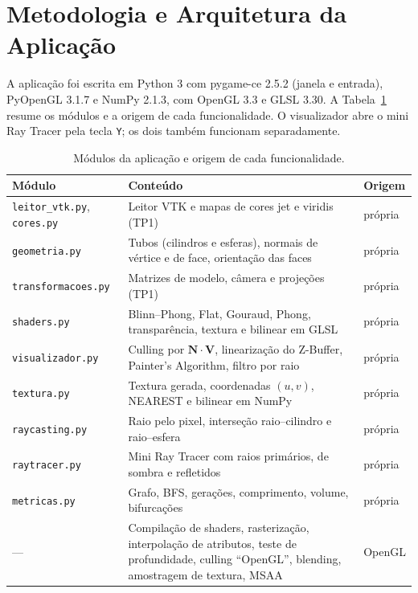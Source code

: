 \documentclass[11pt, a4paper]{article}
\newcommand{\vetor}[1]{\mathbf{#1}}
\begin{document}
\section{Metodologia e Arquitetura da Aplicação}

A aplicação foi escrita em Python 3 com pygame-ce 2.5.2 (janela e entrada), PyOpenGL 3.1.7 e NumPy 2.1.3, com OpenGL 3.3 e GLSL 3.30. A Tabela~\ref{tab:modulos} resume os módulos e a origem de cada funcionalidade. O visualizador abre o mini Ray Tracer pela tecla \texttt{Y}; os dois também funcionam separadamente.

\begin{table}[H]
  \centering
  \small
  \caption{Módulos da aplicação e origem de cada funcionalidade.}
  \label{tab:modulos}
  \begin{tabularx}{\textwidth}{l X l}
    \toprule
    \textbf{Módulo} & \textbf{Conteúdo} & \textbf{Origem} \\
    \midrule
    \texttt{leitor\_vtk.py}, \texttt{cores.py} & Leitor VTK e mapas de cores jet e viridis (TP1) & própria \\
    \texttt{geometria.py} & Tubos (cilindros e esferas), normais de vértice e de face, orientação das faces & própria \\
    \texttt{transformacoes.py} & Matrizes de modelo, câmera e projeções (TP1) & própria \\
    \texttt{shaders.py} & Blinn--Phong, Flat, Gouraud, Phong, transparência, textura e bilinear em GLSL & própria \\
    \texttt{visualizador.py} & Culling por $\vetor{N}\cdot\vetor{V}$, linearização do Z-Buffer, Painter's Algorithm, filtro por raio & própria \\
    \texttt{textura.py} & Textura gerada, coordenadas $(u, v)$, NEAREST e bilinear em NumPy & própria \\
    \texttt{raycasting.py} & Raio pelo pixel, interseção raio--cilindro e raio--esfera & própria \\
    \texttt{raytracer.py} & Mini Ray Tracer com raios primários, de sombra e refletidos & própria \\
    \texttt{metricas.py} & Grafo, BFS, gerações, comprimento, volume, bifurcações & própria \\
    --- & Compilação de shaders, rasterização, interpolação de atributos, teste de profundidade, culling ``OpenGL'', blending, amostragem de textura, MSAA & OpenGL \\
    \bottomrule
  \end{tabularx}
\end{table}
\end{document}
